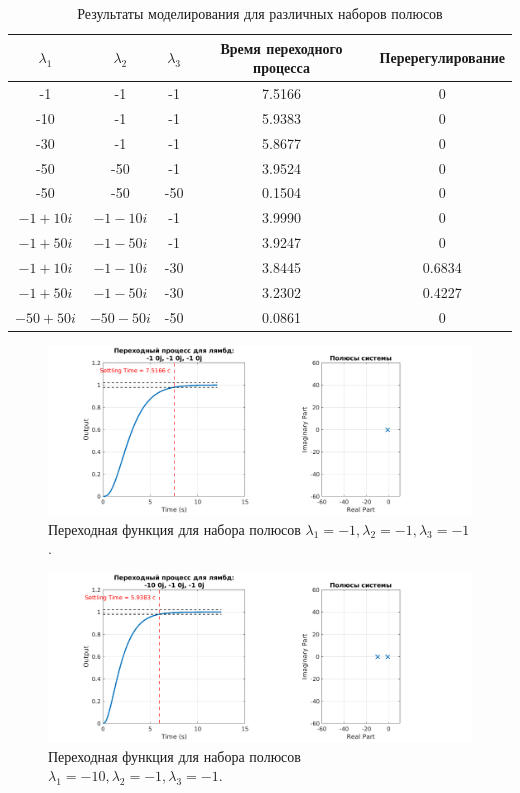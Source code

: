 \begin{table}[ht]
    \centering
    \begin{tabular}{|c|c|c|c|c|}
    \hline
    $\lambda_1$ & $\lambda_2$ & $\lambda_3$ & Время переходного процесса & Перерегулирование \\ \hline
    -1 & -1 & -1 & 7.5166 & 0 \\ \hline
    -10 & -1 & -1 & 5.9383 & 0 \\ \hline
    -30 & -1 & -1 & 5.8677 & 0 \\ \hline
    -50 & -50 & -1 & 3.9524 & 0 \\ \hline
    -50 & -50 & -50 & 0.1504 & 0 \\ \hline
    $-1 + 10i$ & $-1 - 10i$ & -1 & 3.9990 & 0 \\ \hline
    $-1 + 50i$ & $-1 - 50i$ & -1 & 3.9247 & 0 \\ \hline
    $-1 + 10i$ & $-1 - 10i$ & -30 & 3.8445 & 0.6834 \\ \hline
    $-1 + 50i$ & $-1 - 50i$ & -30 & 3.2302 & 0.4227 \\ \hline
    $-50 + 50i$ & $-50 - 50i$ & -50 & 0.0861 & 0 \\ \hline
    \end{tabular}
    \caption{\label{table:task_2}Результаты моделирования для различных наборов полюсов}
\end{table}

\begin{figure}
    \centering
    \includegraphics[width=1\textwidth]{figs/task_2_out_1.png}
    \caption{Переходная функция для набора полюсов $\lambda_1 = -1, \lambda_2 = -1, \lambda_3 = -1$.}
    \label{fig:task_2_out_1}
\end{figure}

\begin{figure}
    \centering
    \includegraphics[width=1\textwidth]{figs/task_2_out_2.png}
    \caption{Переходная функция для набора полюсов $\lambda_1 = -10, \lambda_2 = -1, \lambda_3 = -1$.}
    \label{fig:task_2_out_2}
\end{figure}

